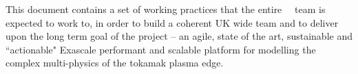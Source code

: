 This document contains a set of working practices that the entire \exc \ \nep\ 
team is expected to work to, in order to build a coherent UK wide team and to deliver
upon the long term goal of the project -- an agile, state of the art, sustainable and 
``actionable" Exascale performant and scalable platform for modelling the 
complex multi-physics of the tokamak plasma edge.
